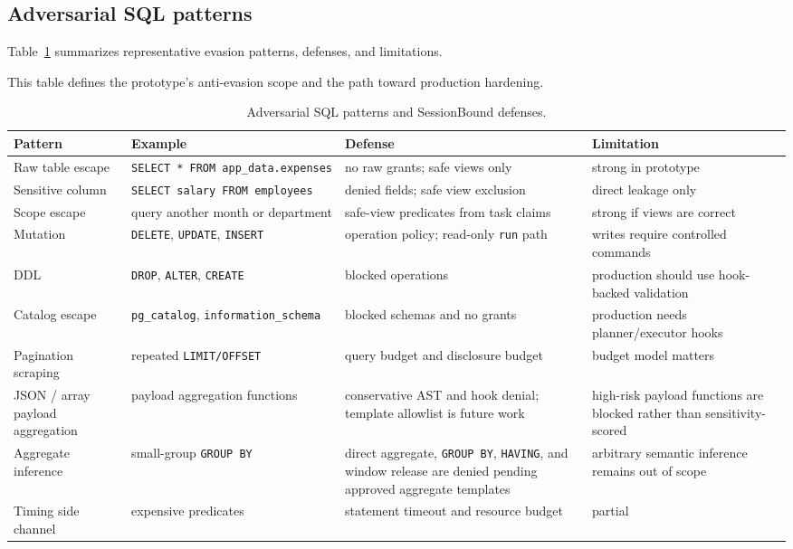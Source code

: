 \documentclass[journal]{IEEEtran}
\begin{document}
\hypertarget{adversarial-sql-patterns}{%
\subsection{Adversarial SQL
patterns}\label{adversarial-sql-patterns}}

Table~\ref{tab:anti-evasion} summarizes representative evasion
patterns, defenses, and limitations.

This table defines the prototype's anti-evasion scope and the path
toward production hardening.

\begin{table}[!t]
\centering
\scriptsize
\setlength{\tabcolsep}{3pt}
\caption{Adversarial SQL patterns and SessionBound defenses.}
\label{tab:anti-evasion}
\begin{tabular}{@{}
  >{\raggedright\arraybackslash}p{}
  >{\raggedright\arraybackslash}p{}
  >{\raggedright\arraybackslash}p{}
  >{\raggedright\arraybackslash}p{}@{}}
\toprule
Pattern & Example & Defense & Limitation \\
\midrule
Raw table escape & \texttt{SELECT\ *\ FROM\ app\_data.expenses} & no raw
grants; safe views only & strong in prototype \\
Sensitive column & \texttt{SELECT\ salary\ FROM\ employees} & denied
fields; safe view exclusion & direct leakage only \\
Scope escape & query another month or department & safe-view predicates
from task claims & strong if views are correct \\
Mutation & \texttt{DELETE}, \texttt{UPDATE}, \texttt{INSERT} & operation
policy; read-only \texttt{run} path & writes require controlled
commands \\
DDL & \texttt{DROP}, \texttt{ALTER}, \texttt{CREATE} & blocked
operations & production should use hook-backed validation \\
Catalog escape & \texttt{pg\_catalog}, \texttt{information\_schema} &
blocked schemas and no grants & production needs planner/executor hooks \\
Pagination scraping & repeated \texttt{LIMIT/OFFSET} & query budget and
disclosure budget & budget model matters \\
JSON / array payload aggregation & payload aggregation functions &
conservative AST and hook denial; template allowlist is future work &
high-risk payload functions are blocked rather than sensitivity-scored \\
Aggregate inference & small-group \texttt{GROUP\ BY} & direct aggregate,
\texttt{GROUP\ BY}, \texttt{HAVING}, and window release are denied pending
approved aggregate templates & arbitrary semantic inference remains out of
scope \\
Timing side channel & expensive predicates & statement timeout and
resource budget & partial \\
\bottomrule
\end{tabular}
\end{table}
\end{document}
